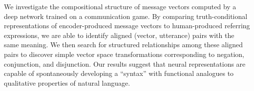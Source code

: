 We investigate the compositional structure of message vectors computed by a deep network trained on a communication game. By comparing truth-conditional representations of encoder-produced message vectors to human-produced referring expressions, we are able to identify aligned (vector, utterance) pairs with the same meaning. We then search for structured relationships among these aligned pairs to discover simple vector space transformations corresponding to negation, conjunction, and disjunction. Our results suggest that neural representations are capable of spontaneously developing a ``syntax'' with functional analogues to qualitative properties of natural language.
